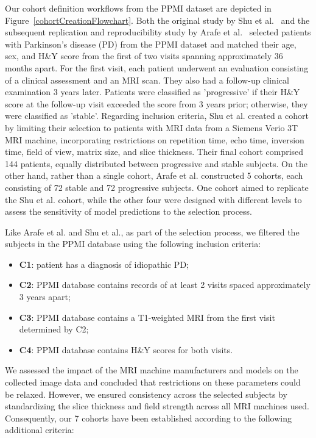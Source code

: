 Our cohort definition workflows from the PPMI dataset are depicted in Figure~\ref{cohortCreationFlowchart}. Both the original study by Shu et al.~\cite{shu2021predicting} and the subsequent replication and reproducibility study by 
Arafe et al.~\cite{Arafe2023.05.05.539590} selected patients with Parkinson's disease (PD) from the PPMI dataset and matched their 
age, sex, and H\&Y score from the first of two visits spanning approximately 36 months apart. For the first visit, each patient 
underwent an evaluation consisting of a clinical assessment and an MRI scan. They also had a follow-up clinical examination 3 years later. 
Patients were classified as 'progressive' if their H\&Y score at the follow-up visit exceeded the score from 3 years prior; otherwise, they 
were classified as 'stable'. Regarding inclusion criteria, Shu et al. created a cohort by limiting their selection to patients with MRI data 
from a Siemens Verio 3T MRI machine, incorporating restrictions on repetition time, echo time, inversion time, field of view, matrix size, 
and slice thickness. Their final cohort comprised 144 patients, equally distributed between progressive and stable subjects. 
On the other hand, rather than a single cohort, Arafe et al. constructed 5 cohorts, each consisting of 72 stable and 72 progressive subjects. One 
cohort aimed to replicate the Shu et al. cohort, while the other four were designed with different levels to assess the sensitivity of model predictions to 
the selection process.

Like Arafe et al. and Shu et al., as part of the selection process, we filtered the subjects in the PPMI database using the 
following inclusion criteria:
\begin{itemize}
  \item \textbf{C1}: patient has a diagnosis of idiopathic PD;
  \item \textbf{C2}: PPMI database contains records of at least 2 visits spaced approximately 3 years apart;
  \item \textbf{C3}: PPMI database contains a T1-weighted MRI from the first visit determined by C2;
  \item \textbf{C4}: PPMI database contains H\&Y scores for both visits. 
\end{itemize}

We assessed the impact of the MRI machine manufacturers and models on the collected image data and concluded that restrictions on these parameters could be relaxed. 
However, we ensured consistency across the selected subjects by standardizing the slice thickness and field strength across all MRI machines used. Consequently, our 7 
cohorts have been established according to the following additional criteria:

